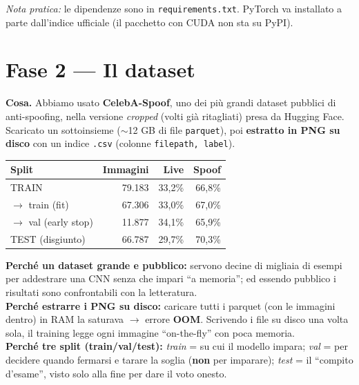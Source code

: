 \documentclass[11pt,a4paper]{article}
\newcommand{\acr}[1]{\textbf{#1}}
\newcommand{\say}[1]{``#1''}
\begin{document}
\textit{Nota pratica:} le dipendenze sono in \texttt{requirements.txt}. PyTorch va installato a
parte dall'indice ufficiale (il pacchetto con CUDA non sta su PyPI).

\section{Fase 2 --- Il dataset}
\textbf{Cosa.} Abbiamo usato \textbf{CelebA-Spoof}, uno dei pi\`u grandi dataset pubblici di
anti-spoofing, nella versione \emph{cropped} (volti gi\`a ritagliati) presa da Hugging Face.
Scaricato un sottoinsieme ($\sim$12 GB di file \texttt{parquet}), poi \textbf{estratto in PNG su
disco} con un indice \texttt{.csv} (colonne \texttt{filepath, label}).

\begin{center}
\small
\begin{tabular}{@{}lrrr@{}}
\toprule
\textbf{Split} & \textbf{Immagini} & \textbf{Live} & \textbf{Spoof} \\
\midrule
TRAIN              & 79.183 & 33,2\% & 66,8\% \\
\quad$\rightarrow$ train (fit)        & 67.306 & 33,0\% & 67,0\% \\
\quad$\rightarrow$ val (early stop)   & 11.877 & 34,1\% & 65,9\% \\
TEST (disgiunto)   & 66.787 & 29,7\% & 70,3\% \\
\bottomrule
\end{tabular}
\end{center}

\begin{perchebox}
\textbf{Perch\'e un dataset grande e pubblico:} servono decine di migliaia di esempi per
addestrare una CNN senza che impari \say{a memoria}; ed essendo pubblico i risultati sono
confrontabili con la letteratura.\\[4pt]
\textbf{Perch\'e estrarre i PNG su disco:} caricare tutti i parquet (con le immagini dentro) in
RAM la saturava $\rightarrow$ errore \acr{OOM}. Scrivendo i file su disco una volta sola, il
training legge ogni immagine \say{on-the-fly} con poca memoria. \\[4pt]
\textbf{Perch\'e tre split (train/val/test):}
\emph{train} = su cui il modello impara;
\emph{val} = per decidere quando fermarsi e tarare la soglia (\textbf{non} per imparare);
\emph{test} = il \say{compito d'esame}, visto solo alla fine per dare il voto onesto.
\end{perchebox}
\end{document}
